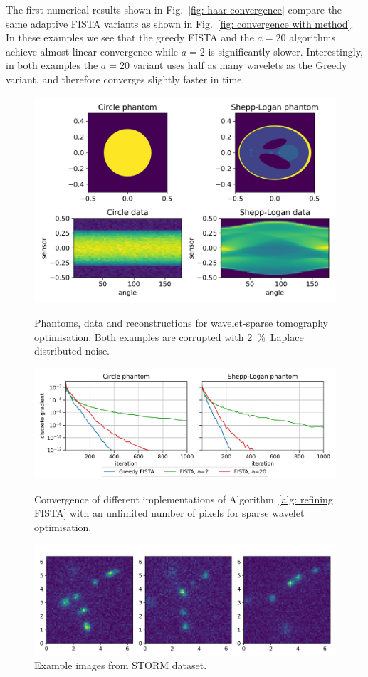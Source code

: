 \documentclass[smallextended]{svjour3}
\newcommand{\1}{\F{1}}
\begin{document}
	The first numerical results shown in Fig.~\ref{fig: haar convergence} compare the same adaptive FISTA variants as shown in Fig.~\ref{fig: convergence with method}. In these examples we see that the greedy FISTA and the $a=20$ algorithms achieve almost linear convergence while $a=2$ is significantly slower. Interestingly, in both examples the $a=20$ variant uses half as many wavelets as the Greedy variant, and therefore converges slightly faster in time. 
	
	\begin{figure}\centering
		\includegraphics[width=.85\textwidth]{haar_data}
		\caption{Phantoms, data and reconstructions for wavelet-sparse tomography optimisation. Both examples are corrupted with \SI{2}{\percent}\ Laplace distributed noise. }\label{fig: haar data}
		
		\vspace*{\floatsep}
		
		\includegraphics[width=.85\textwidth]{haar_convergence_short}
		\caption{Convergence of different implementations of Algorithm~\ref{alg: refining FISTA} with an unlimited number of pixels for sparse wavelet optimisation.}\label{fig: haar convergence}
		
		\vspace*{\floatsep}
		
		\includegraphics[width=.85\textwidth]{STORM_data}
		\caption{Example images from STORM dataset.}\label{fig: STORM data}
	\end{figure}
	
\end{document}

